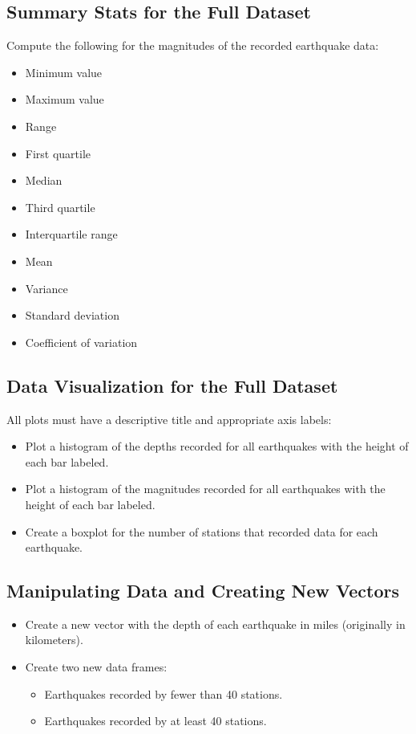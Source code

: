 \documentclass{article}
\begin{document}
\subsection*{Summary Stats for the Full Dataset}
Compute the following for the magnitudes of the recorded earthquake data:
\begin{itemize}
    \item Minimum value
    \item Maximum value
    \item Range
    \item First quartile
    \item Median
    \item Third quartile
    \item Interquartile range
    \item Mean
    \item Variance
    \item Standard deviation
    \item Coefficient of variation
\end{itemize}

\subsection*{Data Visualization for the Full Dataset}
All plots must have a descriptive title and appropriate axis labels:
\begin{itemize}
    \item Plot a histogram of the depths recorded for all earthquakes with the height of each bar labeled.
    \item Plot a histogram of the magnitudes recorded for all earthquakes with the height of each bar labeled.
    \item Create a boxplot for the number of stations that recorded data for each earthquake.
\end{itemize}

\subsection*{Manipulating Data and Creating New Vectors}
\begin{itemize}
    \item Create a new vector with the depth of each earthquake in miles (originally in kilometers).
    \item Create two new data frames:
    \begin{itemize}
        \item Earthquakes recorded by fewer than 40 stations.
        \item Earthquakes recorded by at least 40 stations.
    \end{itemize}
\end{itemize}
\end{document}
